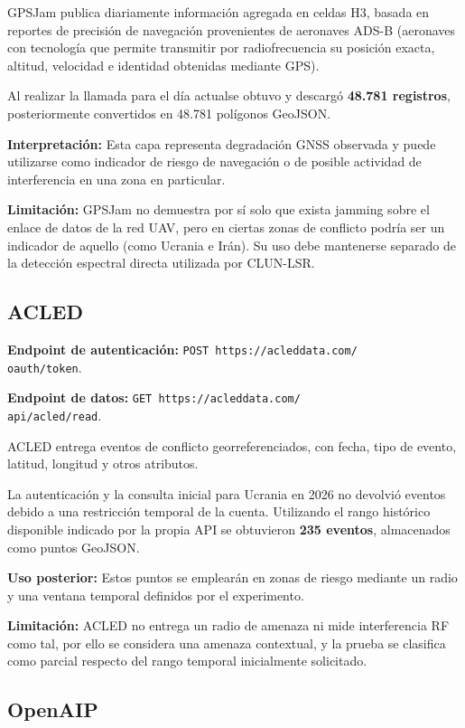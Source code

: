 \documentclass[journal,10pt]{IEEEtran}
\begin{document}
GPSJam publica diariamente información agregada en celdas H3, basada en reportes de precisión de
navegación provenientes de aeronaves ADS-B (aeronaves con tecnología que permite transmitir por radiofrecuencia su posición exacta, altitud, velocidad e identidad obtenidas mediante GPS).

Al realizar la llamada para el día actualse obtuvo y descargó \textbf{48.781 registros},
posteriormente convertidos en 48.781 polígonos GeoJSON. 

\textbf{Interpretación:} Esta capa representa degradación GNSS observada y puede utilizarse como
indicador de riesgo de navegación o de posible actividad de interferencia en una zona en particular.

\textbf{Limitación:} GPSJam no demuestra por sí solo que exista jamming sobre el enlace de datos
de la red UAV, pero en ciertas zonas de conflicto podría ser un indicador de aquello (como Ucrania e Irán). Su uso debe mantenerse separado de la detección espectral directa utilizada por
CLUN-LSR.

\subsection{ACLED}

\textbf{Endpoint de autenticación:}
\texttt{POST https://acleddata.com/ \\ oauth/token}.

\textbf{Endpoint de datos:}
\texttt{GET https://acleddata.com/ \\ api/acled/read}.

ACLED entrega eventos de conflicto georreferenciados, con fecha, tipo de evento, latitud,
longitud y otros atributos.

La autenticación y la consulta inicial para Ucrania en 2026 no
devolvió eventos debido a una restricción temporal de la cuenta. Utilizando el rango histórico
disponible indicado por la propia API se obtuvieron \textbf{235 eventos}, almacenados como puntos
GeoJSON.

\textbf{Uso posterior:} Estos puntos se emplearán en zonas de riesgo mediante un radio y
una ventana temporal definidos por el experimento.

\textbf{Limitación:} ACLED no entrega un radio de amenaza ni mide interferencia RF como tal, por ello se
considera una amenaza contextual, y la prueba se clasifica como parcial respecto del rango
temporal inicialmente solicitado.

\subsection{OpenAIP}
\end{document}
